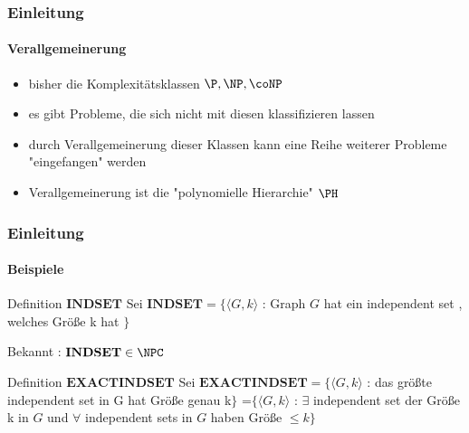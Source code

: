 \begin{frame}
		\frametitle{Einleitung}
		\framesubtitle{Verallgemeinerung}
		
		\begin{itemize}[<+->]
			\item bisher die Komplexitätsklassen $\P, \NP , \coNP$
			\item es gibt Probleme, die sich nicht mit diesen klassifizieren lassen
			\item durch Verallgemeinerung dieser Klassen kann eine Reihe weiterer Probleme "eingefangen" werden
			\item Verallgemeinerung ist die "polynomielle Hierarchie" $\PH$ 
		\end{itemize}
\end{frame}
\begin{frame}
	\frametitle{Einleitung}
	\framesubtitle{Beispiele}
	
	\begin{KITinfoblock}{Definition $\mathbf{INDSET}$}
	Sei $\mathbf{INDSET} = \lbrace \langle G,k \rangle $ : Graph $G$ hat ein
	independent set , welches Größe k hat $\rbrace$
	\end{KITinfoblock}
	\bigskip
	\pause
	Bekannt : $\mathbf{INDSET} \in \NPC$
	\bigskip
	\pause
	\begin{KITinfoblock}{Definition $\mathbf{EXACT INDSET}$}
	Sei $\mathbf{EXACT INDSET} = \lbrace \langle G,k \rangle $ : das größte
	independent set in G hat Größe genau k$\rbrace$ \newline
	=$\lbrace \langle G,k \rangle$ : $\exists$ independent set der Größe k in $G$
	und $\forall$ independent sets in $G$ haben Größe $\leq k \rbrace$
	\end{KITinfoblock}
\end{frame}
